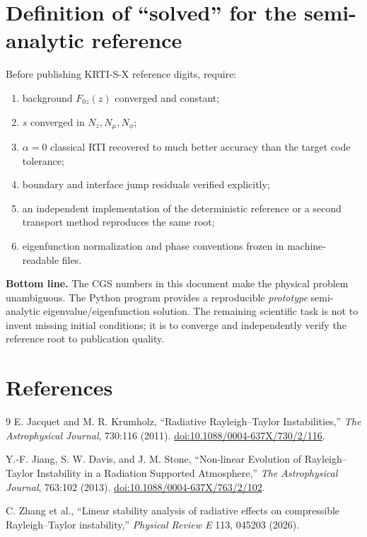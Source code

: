 \documentclass[11pt]{article}
\begin{document}
\section{Definition of ``solved'' for the semi-analytic reference}
Before publishing KRTI-S-X reference digits, require:
\begin{enumerate}[leftmargin=2em]
\item background $F_{0z}(z)$ converged and constant;
\item $s$ converged in $N_z,N_\mu,N_\phi$;
\item $\alpha=0$ classical RTI recovered to much better accuracy than the target code tolerance;
\item boundary and interface jump residuals verified explicitly;
\item an independent implementation of the deterministic reference or a second transport method reproduces the same root;
\item eigenfunction normalization and phase conventions frozen in machine-readable files.
\end{enumerate}

\begin{successbox}
\textbf{Bottom line.} The CGS numbers in this document make the physical problem unambiguous. The Python program provides a reproducible \emph{prototype} semi-analytic eigenvalue/eigenfunction solution. The remaining scientific task is not to invent missing initial conditions; it is to converge and independently verify the reference root to publication quality.
\end{successbox}

\newpage
\section*{References}
\begin{thebibliography}{9}
E. Jacquet and M. R. Krumholz,
``Radiative Rayleigh--Taylor Instabilities,''
\emph{The Astrophysical Journal}, 730:116 (2011).
\href{https://doi.org/10.1088/0004-637X/730/2/116}{doi:10.1088/0004-637X/730/2/116}.

Y.-F. Jiang, S. W. Davis, and J. M. Stone,
``Non-linear Evolution of Rayleigh--Taylor Instability in a Radiation Supported Atmosphere,''
\emph{The Astrophysical Journal}, 763:102 (2013).
\href{https://doi.org/10.1088/0004-637X/763/2/102}{doi:10.1088/0004-637X/763/2/102}.

C. Zhang et al.,
``Linear stability analysis of radiative effects on compressible Rayleigh--Taylor instability,''
\emph{Physical Review E} 113, 045203 (2026).
\end{thebibliography}
\end{document}
